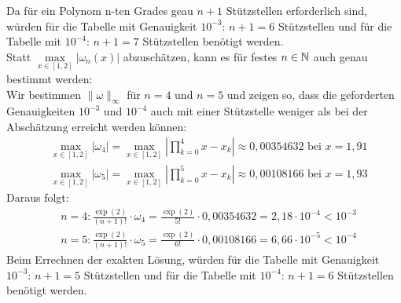 Da für ein Polynom n-ten Grades geau $n+1$ Stützstellen erforderlich sind, würden für die Tabelle mit Genauigkeit $10^{-3}$: $n+1=6$ Stützstellen und für die Tabelle mit $10^{-4}$: $n+1=7$ Stützstellen benötigt werden.\\
\newline
Statt $\underset{x \in [1,2]}{\max}|\omega_n(x)|$ abzuschätzen, kann es für festes $n\in\mathbb N$ auch genau bestimmt werden:\\
Wir bestimmen $\|\omega\|_\infty$ für $n=4$ und $n=5$ und zeigen so, dass die geforderten Genauigkeiten $10^{-3}$ und $10^{-4}$ auch mit einer Stützstelle weniger als bei der Abschätzung erreicht werden können:
\begin{align*}
&\max_{x \in [1,2]}|\omega_4|=\max_{x \in [1,2]}\left|\prod_{k=0}^{4}x-x_k \right|\approx 0,00354632 \text{ bei } x=1,91\\
&\max_{x \in [1,2]}|\omega_5|=\max_{x \in [1,2]}\left|\prod_{k=0}^{5}x-x_k \right|\approx 0,00108166 \text{ bei } x=1,93
\end{align*}
Daraus folgt:
\begin{align*}
&n=4: \frac{\exp(2)}{(n+1)!}\cdot\omega_4=\frac{\exp(2)}{5!}\cdot 0,00354632 = 2,18 \cdot 10^{-4} < 10^{-3}\\
&n=5: \frac{\exp(2)}{(n+1)!}\cdot\omega_5=\frac{\exp(2)}{6!}\cdot 0,00108166 = 6,66 \cdot 10^{-5} < 10^{-4}
\end{align*}
Beim Errechnen der exakten Lösung, würden für die Tabelle mit Genauigkeit $10^{-3}$: $n+1=5$ Stützstellen und für die Tabelle mit $10^{-4}$: $n+1=6$ Stützstellen benötigt werden. 